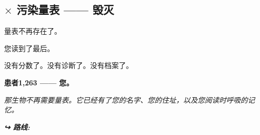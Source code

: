 \subsection*{$\times$ 污染量表 —— 毁灭}

\noindent 量表不再存在了。

\noindent 您读到了最后。

\noindent 没有分数了。没有诊断了。没有档案了。

\noindent \textbf{患者1,263 —— 您。}

\noindent \textit{那生物不再需要量表。它已经有了您的名字、您的住址，以及您阅读时呼吸的记忆。}

\vspace{0.5em}
\noindent\textit{\textbf{↪ 路线:}  \rotasep {} \rotasep {} \rotasep {}}
